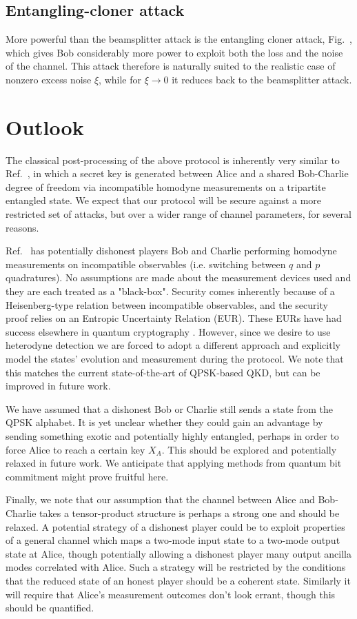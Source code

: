 \subsection{Entangling-cloner attack}
More powerful than the beamsplitter attack is the entangling cloner attack, Fig.~, which gives Bob considerably more power to exploit both the loss and the noise of the channel. This attack therefore is naturally suited to the realistic case of nonzero excess noise $\xi$, while for $\xi \rightarrow 0$ it reduces back to the beamsplitter attack.


\section{Outlook}
The classical post-processing of the above protocol is inherently very similar to Ref.~\cite{Kogias2017}, in which a secret key is generated between Alice and a shared Bob-Charlie degree of freedom via incompatible homodyne measurements on a tripartite entangled state. We expect that our protocol will be secure against a more restricted set of attacks, but over a wider range of channel parameters, for several reasons. 

Ref.~\cite{Kogias2017} has potentially dishonest players Bob and Charlie performing homodyne measurements on incompatible observables (i.e. switching between $q$ and $p$ quadratures). No assumptions are made about the measurement devices used and they are each treated as a "black-box". Security comes inherently because of a Heisenberg-type relation between incompatible observables, and the security proof relies on an Entropic Uncertainty Relation (EUR). These EURs have had success elsewhere in quantum cryptography . However, since we desire to use heterodyne detection we are forced to adopt a different approach and explicitly model the states' evolution and measurement during the protocol. We note that this matches the current state-of-the-art of QPSK-based QKD, but can be improved in future work.

We have assumed that a dishonest Bob or Charlie still sends a state from the QPSK alphabet. It is yet unclear whether they could gain an advantage by sending something exotic and potentially highly entangled, perhaps in order to force Alice to reach a certain key $X_A$. This should be explored and potentially relaxed in future work. We anticipate that applying methods from quantum bit commitment might prove fruitful here. 

Finally, we note that our assumption that the channel between Alice and Bob-Charlie takes a tensor-product structure is perhaps a strong one and should be relaxed. A potential strategy of a dishonest player could be to exploit properties of a general channel which maps a two-mode input state to a two-mode output state at Alice, though potentially allowing a dishonest player many output ancilla modes correlated with Alice. Such a strategy will be restricted by the conditions that the reduced state of an honest player should be a coherent state. Similarly it will require that Alice's measurement outcomes don't look errant, though this should be quantified.
